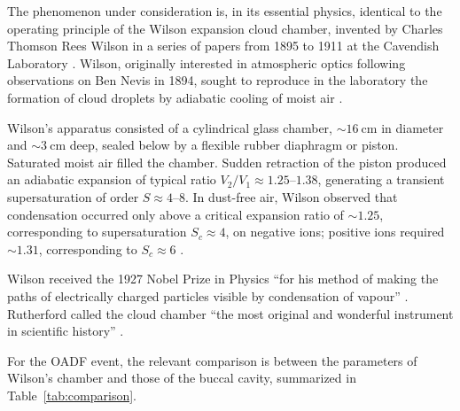 \documentclass[11pt,a4paper]{article}
\theoremstyle{definition}
\theoremstyle{plain}
\begin{document}
The phenomenon under consideration is, in its essential physics, identical to the operating principle of the Wilson expansion cloud chamber, invented by Charles Thomson Rees Wilson in a series of papers from 1895 to 1911 at the Cavendish Laboratory \citep{Wilson1897,Wilson1899,Wilson1911}. Wilson, originally interested in atmospheric optics following observations on Ben Nevis in 1894, sought to reproduce in the laboratory the formation of cloud droplets by adiabatic cooling of moist air \citep{Galison1997}.

Wilson's apparatus consisted of a cylindrical glass chamber, $\sim\!\SI{16}{\centi\meter}$ in diameter and $\sim\!\SI{3}{\centi\meter}$ deep, sealed below by a flexible rubber diaphragm or piston. Saturated moist air filled the chamber. Sudden retraction of the piston produced an adiabatic expansion of typical ratio $V_2/V_1 \approx 1.25\text{--}1.38$, generating a transient supersaturation of order $S \approx 4\text{--}8$. In dust-free air, Wilson observed that condensation occurred only above a critical expansion ratio of $\sim\!1.25$, corresponding to supersaturation $S_c \approx 4$, on negative ions; positive ions required $\sim\!1.31$, corresponding to $S_c \approx 6$ \citep{Wilson1899}.

Wilson received the 1927 Nobel Prize in Physics ``for his method of making the paths of electrically charged particles visible by condensation of vapour'' \citep{NobelPrize1927}. Rutherford called the cloud chamber ``the most original and wonderful instrument in scientific history'' \citep{Galison1997}.

For the OADF event, the relevant comparison is between the parameters of Wilson's chamber and those of the buccal cavity, summarized in Table~\ref{tab:comparison}.
\end{document}
